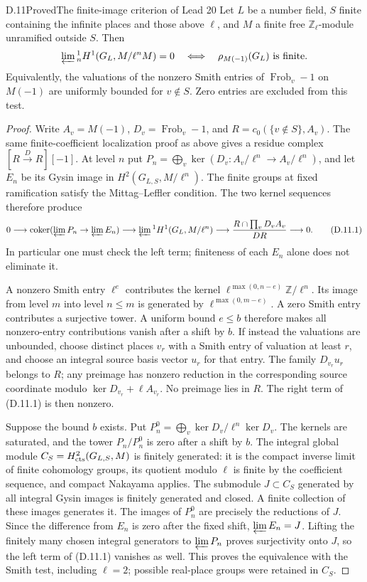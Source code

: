\begin{statement}{D.11}{Proved}{The finite-image criterion of Lead 20}
Let \(L\) be a number field, \(S\) finite containing the infinite
places and those above \(\ell\), and \(M\) a finite free
\(\mathbb Z_\ell\)-module unramified outside \(S\). Then
\[
\varprojlim{}^1_nH^1(G_L,M/\ell^nM)=0
\quad\Longleftrightarrow\quad
\rho_{M(-1)}(G_L)\text{ is finite}.
\]
Equivalently, the valuations of the nonzero Smith entries of
\(\operatorname{Frob}_v-1\) on \(M(-1)\) are uniformly bounded
for \(v\notin S\). Zero entries are excluded from this test.
\end{statement}
\begin{proof}
Write \(A_v=M(-1)\), \(D_v=\operatorname{Frob}_v-1\), and
\(R=c_0(\{v\notin S\},A_v)\). The same finite-coefficient
localization proof as above gives a residue complex
\([R\xrightarrow D R][-1]\). At level \(n\) put
\(P_n=\bigoplus_v\ker(D_v:A_v/\ell^n\to A_v/\ell^n)\), and
let \(E_n\) be its Gysin image in \(H^2(G_{L,S},M/\ell^n)\).
The finite groups at fixed ramification satisfy the
Mittag--Leffler condition. The two kernel sequences therefore
produce
\[
0\longrightarrow
\operatorname{coker}(\varprojlim P_n\to\varprojlim E_n)
\longrightarrow\varprojlim{}^1H^1(G_L,M/\ell^n)
\longrightarrow
\frac{R\cap\prod_vD_vA_v}{DR}\longrightarrow0.                 \tag{D.11.1}
\]
In particular one must check the left term; finiteness of each
\(E_n\) alone does not eliminate it.

A nonzero Smith entry \(\ell^e\) contributes the kernel
\(\ell^{\max(0,n-e)}\mathbb Z/\ell^n\). Its image from level
\(m\) into level \(n\le m\) is generated by
\(\ell^{\max(0,m-e)}\). A zero Smith entry contributes a
surjective tower. A uniform bound \(e\le b\) therefore makes
all nonzero-entry contributions vanish after a shift by \(b\).
If instead the valuations are unbounded, choose distinct places
\(v_r\) with a Smith entry of valuation at least \(r\), and
choose an integral source basis vector \(u_r\) for that entry.
The family \(D_{v_r}u_r\) belongs to \(R\); any preimage has
nonzero reduction in the corresponding source coordinate modulo
\(\ker D_{v_r}+\ell A_{v_r}\). No preimage lies in \(R\).
The right term of (D.11.1) is then nonzero.

Suppose the bound \(b\) exists. Put
\(P_n^0=\bigoplus_v\ker D_v/\ell^n\ker D_v\).
The kernels are saturated, and the tower \(P_n/P_n^0\) is zero
after a shift by \(b\). The integral global module
\(C_S=H^2_{\rm cts}(G_{L,S},M)\) is finitely generated: it is
the compact inverse limit of finite cohomology groups, its
quotient modulo \(\ell\) is finite by the coefficient sequence,
and compact Nakayama applies. The submodule \(J\subset C_S\)
generated by all integral Gysin images is finitely generated
and closed. A finite collection of these images generates it.
The images of \(P_n^0\) are precisely the reductions of \(J\).
Since the difference from \(E_n\) is zero after the fixed shift,
\(\varprojlim E_n=J\). Lifting the finitely many chosen
integral generators to \(\varprojlim P_n\) proves surjectivity
onto \(J\), so the left term of (D.11.1) vanishes as well.
This proves the equivalence with the Smith test, including
\(\ell=2\); possible real-place groups were retained in \(C_S\).


\end{proof}
